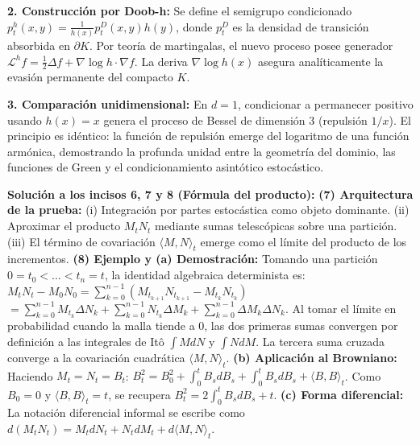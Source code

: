 \documentclass[11pt, letterpaper]{article}
\begin{document}
\begin{solucion}
    \textbf{2. Construcción por Doob-h:}
    Se define el semigrupo condicionado $p_t^h(x, y) = \frac{1}{h(x)} p_t^D(x, y) h(y)$, donde $p_t^D$ es la densidad de transición absorbida en $\partial K$. Por teoría de martingalas, el nuevo proceso posee generador $\mathcal{L}^h f = \frac{1}{2}\Delta f + \nabla \log h \cdot \nabla f$. La deriva $\nabla \log h(x)$ asegura analíticamente la evasión permanente del compacto $K$.
    
    \textbf{3. Comparación unidimensional:}
    En $d=1$, condicionar a permanecer positivo usando $h(x)=x$ genera el proceso de Bessel de dimensión 3 (repulsión $1/x$). El principio es idéntico: la función de repulsión emerge del logaritmo de una función armónica, demostrando la profunda unidad entre la geometría del dominio, las funciones de Green y el condicionamiento asintótico estocástico.

    \vspace{3mm}
    \textbf{Solución a los incisos 6, 7 y 8 (Fórmula del producto):}
    \textbf{(7) Arquitectura de la prueba:} (i) Integración por partes estocástica como objeto dominante. (ii) Aproximar el producto $M_t N_t$ mediante sumas telescópicas sobre una partición. (iii) El término de covariación $\langle M, N \rangle_t$ emerge como el límite del producto de los incrementos.
    \textbf{(8) Ejemplo y (a) Demostración:}
    Tomando una partición $0 = t_0 < \dots < t_n = t$, la identidad algebraica determinista es:
    $M_t N_t - M_0 N_0 = \sum_{k=0}^{n-1} (M_{t_{k+1}} N_{t_{k+1}} - M_{t_k} N_{t_k})$
    $= \sum_{k=0}^{n-1} M_{t_k} \Delta N_k + \sum_{k=0}^{n-1} N_{t_k} \Delta M_k + \sum_{k=0}^{n-1} \Delta M_k \Delta N_k$.
    Al tomar el límite en probabilidad cuando la malla tiende a 0, las dos primeras sumas convergen por definición a las integrales de Itô $\int M dN$ y $\int N dM$. La tercera suma cruzada converge a la covariación cuadrática $\langle M, N \rangle_t$.
    \textbf{(b) Aplicación al Browniano:}
    Haciendo $M_t = N_t = B_t$:
    $B_t^2 = B_0^2 + \int_0^t B_s dB_s + \int_0^t B_s dB_s + \langle B, B \rangle_t$.
    Como $B_0 = 0$ y $\langle B, B \rangle_t = t$, se recupera $B_t^2 = 2 \int_0^t B_s dB_s + t$.
    \textbf{(c) Forma diferencial:}
    La notación diferencial informal se escribe como $d(M_t N_t) = M_t dN_t + N_t dM_t + d\langle M, N \rangle_t$.
\end{solucion}

\newpage
\end{document}
